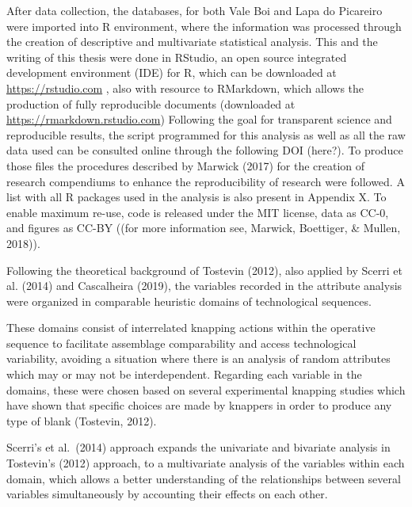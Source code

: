 \documentclass[12pt,twoside]{reedthesis}
\begin{document}
After data collection, the databases, for both Vale Boi and Lapa do Picareiro were imported into R environment, where the information was processed through the creation of descriptive and multivariate statistical analysis. This and the writing of this thesis were done in RStudio, an open source integrated development environment (IDE) for R, which can be downloaded at \url{https://rstudio.com} , also with resource to RMarkdown, which allows the production of fully reproducible documents (downloaded at \url{https://rmarkdown.rstudio.com}) Following the goal for transparent science and reproducible results, the script programmed for this analysis as well as all the raw data used can be consulted online through the following DOI (here?). To produce those files the procedures described by Marwick (2017) for the creation of research compendiums to enhance the reproducibility of research were followed. A list with all R packages used in the analysis is also present in Appendix X. To enable maximum re-use, code is released under the MIT license, data as CC-0, and figures as CC-BY ((for more information see, Marwick, Boettiger, \& Mullen, 2018)).

Following the theoretical background of Tostevin (2012), also applied by Scerri et al. (2014) and Cascalheira (2019), the variables recorded in the attribute analysis were organized in comparable heuristic domains of technological sequences.

These domains consist of interrelated knapping actions within the operative sequence to facilitate assemblage comparability and access technological variability, avoiding a situation where there is an analysis of random attributes which may or may not be interdependent. Regarding each variable in the domains, these were chosen based on several experimental knapping studies which have shown that specific choices are made by knappers in order to produce any type of blank (Tostevin, 2012).

Scerri's et al.~(2014) approach expands the univariate and bivariate analysis in Tostevin's (2012) approach, to a multivariate analysis of the variables within each domain, which allows a better understanding of the relationships between several variables simultaneously by accounting their effects on each other.
\end{document}
